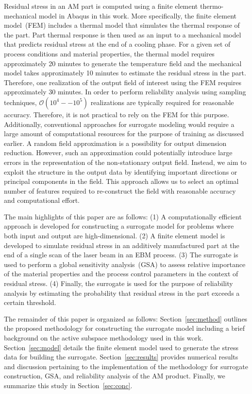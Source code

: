 Residual stress in an AM part is computed using a finite element thermo-mechanical model in Abaqus in this work. 
More specifically, the finite element model~(FEM) includes a thermal model that simulates the thermal response of the
part. Part thermal response is then used as an input to a mechanical model that predicts residual stress at the end
of a cooling phase. For a given set of process conditions and material properties, the thermal model requires
approximately 20 minutes to generate the temperature field and the mechanical model takes approximately 10
minutes to estimate the residual stress in the part. Therefore, one realization of the output field of interest
using the FEM requires approximately 30 minutes. In order to perform reliability analysis using
sampling techniques, $\mathcal{O}(10^4--10^5)$ realizations are typically required for reasonable accuracy.  
Therefore, it is not practical
to rely on the FEM for this purpose. Additionally, conventional approaches for surrogate
modeling would require a large amount of computational resources for the purpose of training as discussed earlier.
 A random field approximation is a possibility for
output dimension reduction. However, such an approximation could potentially introduce large errors in the  
representation of the non-stationary output field. Instead, we aim to exploit the structure in the output data 
by identifying important 
directions or principal components in the field. This approach allows us to select an optimal number of 
features required to re-construct the field with reasonable accuracy and computational effort. 

The main highlights of this paper are as follows: (1) A computationally efficient approach is developed
for constructing a surrogate model for problems where both input and output are high-dimensional.
(2) A finite element model is developed to simulate residual stress in an additively manufactured part
at the end of a single scan of the laser beam in an EBM process. (3) The surrogate is used to perform a global
sensitivity analysis~(GSA) to assess relative importance of the material properties and the process control parameters
in the context of residual stress. (4) Finally, the surrogate is used for the purpose of reliability analysis by estimating the
probability that residual stress in the part exceeds a certain threshold.

The remainder of this paper is organized as follows: Section~\ref{sec:method} outlines the proposed methodology for
constructing the surrogate model including a brief background on the active subspace methodology used in this work.
Section~\ref{sec:model} details the finite element model used to generate the stress data for building the surrogate.
Section~\ref{sec:results} provides numerical results and discussion pertaining to the implementation of the methodology 
for surrogate construction, GSA, and reliability analysis of the AM product. 
Finally, we summarize this study in Section~\ref{sec:conc}. 



